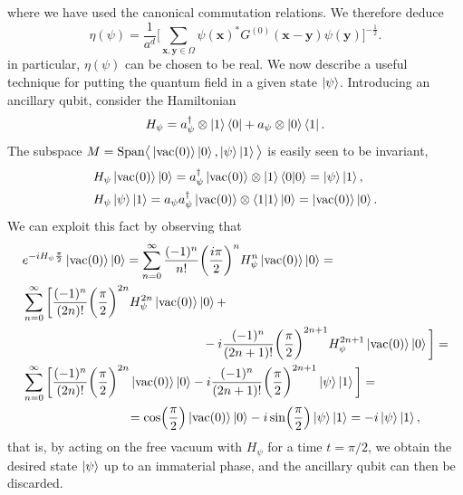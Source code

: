 \documentclass[a4paper,10pt]{report}
\begin{document}
where we have used the canonical commutation relations. We therefore deduce
\begin{equation}
\eta(\psi) = \frac{1}{a^d}\Bigg[\sum_{\mathbf{x},\mathbf{y}\in\Omega}\psi(\mathbf{x})^*G^{(0)}(\mathbf{x}-\mathbf{y})\psi(\mathbf{y})\Bigg]^{-\frac{1}{2}}.
\end{equation}
in particular, $\eta(\psi)$ can be chosen to be real. We now describe a useful technique for putting the quantum field in a given state $\ket{\psi}$. Introducing an ancillary qubit, consider the Hamiltonian
\begin{equation}
H_\psi = a^\dag_\psi\otimes\ket{1}\bra{0} + a_\psi\otimes\ket{0}\bra{1}.
\end{equation}
The subspace $M=\mathrm{Span}\big\langle\ket{\mathrm{vac}(0)}\ket{0},\ket{\psi}\ket{1}\big\rangle$ is easily seen to be invariant,
\begin{align}
&H_\psi\ket{\mathrm{vac}(0)}\ket{0} = a^\dag_\psi\ket{\mathrm{vac}(0)}\otimes\ket{1}\langle0|0\rangle = \ket{\psi}\ket{1}, \\
&H_\psi\ket{\psi}\ket{1} = a_\psi a^\dag_\psi\ket{\mathrm{vac}(0)}\otimes\langle1|1\rangle\ket{0}	 = \ket{\mathrm{vac}(0)}\ket{0}.
\end{align}
We can exploit this fact by observing that
\begin{align}
&e^{-iH_\psi\frac{\pi}{2}}\ket{\mathrm{vac}(0)}\ket{0} = \sum_{n=0}^\infty\frac{(-1)^n}{n!}\bigg(\frac{i\pi}{2}\bigg)^nH_\psi^n\ket{\mathrm{vac}(0)}\ket{0} = \nonumber\\
&\sum_{n=0}^\infty\bigg[\frac{(-1)^n}{(2n)!}\bigg(\frac{\pi}{2}\bigg)^{2n}H_\psi^{2n}\ket{\mathrm{vac}(0)}\ket{0} + \nonumber\\
&\hspace{5cm}-i\frac{(-1)^n}{(2n+1)!}\bigg(\frac{\pi}{2}\bigg)^{2n+1}H_\psi^{2n+1}\ket{\mathrm{vac}(0)}\ket{0}\bigg] = \nonumber\\
&\sum_{n=0}^\infty\bigg[\frac{(-1)^n}{(2n)!}\bigg(\frac{\pi}{2}\bigg)^{2n}\ket{\mathrm{vac}(0)}\ket{0} -i\frac{(-1)^n}{(2n+1)!}\bigg(\frac{\pi}{2}\bigg)^{2n+1}\ket{\psi}\ket{1}\bigg] = \nonumber\\
&\hspace{2.9cm}=\cos(\frac{\pi}{2})\ket{\mathrm{vac}(0)}\ket{0}
-i\sin(\frac{\pi}{2})\ket{\psi}\ket{1} = -i\ket{\psi}\ket{1},
\end{align}
that is, by acting on the free vacuum with $H_\psi$ for a time $t=\pi/2$, we obtain the desired state $\ket{\psi}$ up to an immaterial phase, and the ancillary qubit can then be discarded.
\end{document}
